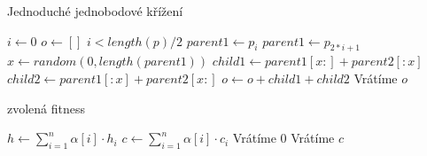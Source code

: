 \begin{algorithm}
\caption{Jednoduché jednobodové křížení}
\begin{algorithmic}[1]  %
    \State $i \gets 0$
    \State $o \gets []$
    \While $i < length(p)/2$
       \State $parent1 \gets p_i$ 
       \State $parent1 \gets p_{2*i+1}$ 
       \State $x \gets random(0, length(parent1))$
       \State $child1 \gets parent1[x:] + parent2[:x]$
       \State $child2 \gets parent1[:x] + parent2[x:]$
       \State $o \gets o + child1 + child2$
    \EndWhile
    \State Vrátíme $o$
\EndFunction
\end{algorithmic}
\end{algorithm}


\begin{algorithm}
\caption{zvolená fitness}
\begin{algorithmic}[1]  %
    \State $h \gets \sum_{i=1}^n \alpha[i] \cdot h_i$
    \State $c \gets \sum_{i=1}^n \alpha[i] \cdot c_i$
        \State Vrátíme $0$
    \EndIf
    \State Vrátíme $c$
\EndFunction
\end{algorithmic}
\end{algorithm}
